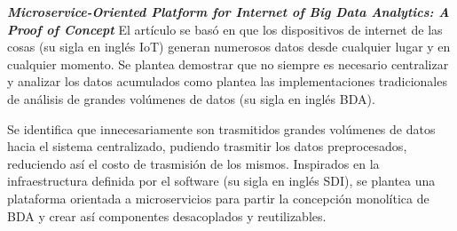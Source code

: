 
\textbf{\emph{Microservice-Oriented Platform for Internet of Big
Data Analytics: A Proof of Concept}} \cite{li_microservice-oriented_2019}
El artículo se basó en que los dispositivos de internet de las cosas (su sigla en inglés IoT) generan numerosos datos desde cualquier lugar y en cualquier momento. Se plantea demostrar que no siempre es necesario centralizar y analizar los datos acumulados como plantea las implementaciones tradicionales de análisis de grandes volúmenes de datos (su sigla en inglés BDA).

Se identifica que innecesariamente son trasmitidos grandes volúmenes de datos hacia el sistema centralizado, pudiendo trasmitir los datos preprocesados, reduciendo así el costo de trasmisión de los mismos. Inspirados en la infraestructura definida por el software (su sigla en inglés SDI), se plantea una plataforma orientada a microservicios para partir la concepción monolítica de BDA y crear así componentes desacoplados y reutilizables.
